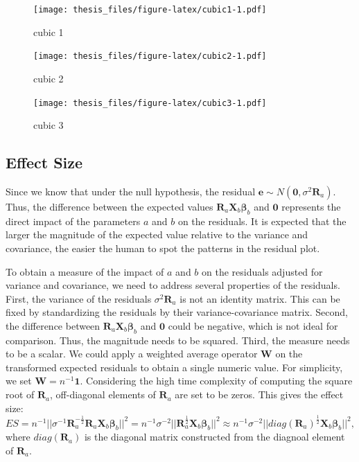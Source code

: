 \documentclass{monashthesis}
\begin{document}
\begin{figure}
\centering
\texttt{[image: thesis\_files/figure-latex/cubic1-1.pdf]}
\caption{\label{fig:cubic1}cubic 1}
\end{figure}

\begin{figure}
\centering
\texttt{[image: thesis\_files/figure-latex/cubic2-1.pdf]}
\caption{\label{fig:cubic2}cubic 2}
\end{figure}

\begin{figure}
\centering
\texttt{[image: thesis\_files/figure-latex/cubic3-1.pdf]}
\caption{\label{fig:cubic3}cubic 3}
\end{figure}

\hypertarget{effect-size}{%
\subsection{Effect Size}\label{effect-size}}

Since we know that under the null hypothesis, the residual \(\boldsymbol{e}\sim N(\boldsymbol{0},\sigma^2\boldsymbol{R}_a)\). Thus, the difference between the expected values \(\boldsymbol{R}_a\boldsymbol{X}_b\boldsymbol{\beta}_b\) and \(\boldsymbol{0}\) represents the direct impact of the parameters \(a\) and \(b\) on the residuals. It is expected that the larger the magnitude of the expected value relative to the variance and covariance, the easier the human to spot the patterns in the residual plot.

To obtain a measure of the impact of \(a\) and \(b\) on the residuals adjusted for variance and covariance, we need to address several properties of the residuals. First, the variance of the residuals \(\sigma^2\boldsymbol{R}_a\) is not an identity matrix. This can be fixed by standardizing the residuals by their variance-covariance matrix. Second, the difference between \(\boldsymbol{R}_a\boldsymbol{X}_b\boldsymbol{\beta}_b\) and \(\boldsymbol{0}\) could be negative, which is not ideal for comparison. Thus, the magnitude needs to be squared. Third, the measure needs to be a scalar. We could apply a weighted average operator \(\boldsymbol{W}\) on the transformed expected residuals to obtain a single numeric value. For simplicity, we set \(\boldsymbol{W}=n^{-1}\boldsymbol{1}\). Considering the high time complexity of computing the square root of \(\boldsymbol{R}_a\), off-diagonal elements of \(\boldsymbol{R}_a\) are set to be zeros. This gives the effect size: \[ES=n^{-1}||\sigma^{-1}\boldsymbol{R}_a^{-\frac{1}{2}}\boldsymbol{R}_a\boldsymbol{X}_b\boldsymbol{\beta}_b||^2=n^{-1}\sigma^{-2}||\boldsymbol{R}_a^{\frac{1}{2}}\boldsymbol{X}_b\boldsymbol{\beta}_b||^2\approx n^{-1}\sigma^{-2}||diag(\boldsymbol{R}_a)^{\frac{1}{2}}\boldsymbol{X}_b\boldsymbol{\beta}_b||^2,\] where \(diag(\boldsymbol{R}_a)\) is the diagonal matrix constructed from the diagnoal element of \(\boldsymbol{R}_a\).
\end{document}
